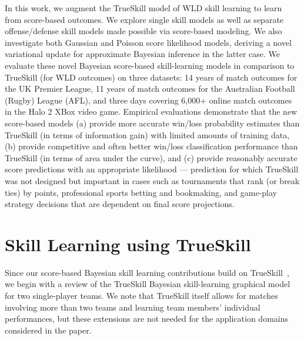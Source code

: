 \documentclass[runningheads,a4paper]{llncs}
\begin{document}
In this work, we augment the TrueSkill model of WLD skill learning to
learn from score-based outcomes.  We explore single skill models as
well as separate offense/defense skill models made possible via
score-based modeling.  We also investigate both Gaussian and Poisson
score likelihood models, deriving a novel variational update for
approximate Bayesian inference in the latter case.  We evaluate these
novel Bayesian score-based skill-learning models in comparison to
TrueSkill (for WLD outcomes) on three datasets: 14 years of match
outcomes for the UK Premier League, 11 years of match outcomes for the
Australian Football (Rugby) League (AFL), and three days covering
6,000+ online match outcomes in the Halo 2 XBox video game.  Empirical
evaluations demonstrate that the new score-based models (a) provide
more accurate win/loss probability estimates than TrueSkill (in terms
of information gain) with limited amounts of training data, (b)
provide competitive and often better win/loss classification
performance than TrueSkill (in terms of area under the curve), and (c)
provide reasonably accurate score predictions with an appropriate
likelihood --- prediction for which TrueSkill was not designed but
important in cases such as tournaments that rank (or break ties) by
points, professional sports betting and bookmaking, and game-play
strategy decisions that are dependent on final score projections.

\section{Skill Learning using TrueSkill}

Since our score-based Bayesian skill learning contributions build on
TrueSkill~\cite{herbrich06569}, we begin with a review of the
TrueSkill Bayesian skill-learning graphical model for two
single-player teams.  We note that TrueSkill itself allows for matches
involving more than two teams and learning team members' individual
performances, but these extensions are not needed for the application
domains considered in the paper.
\end{document}
